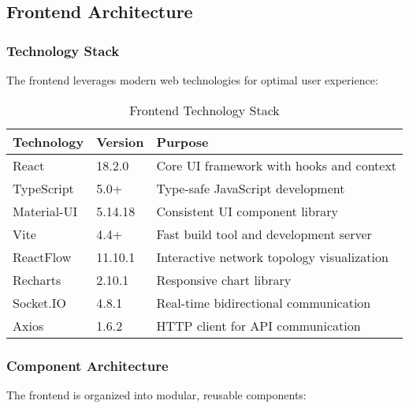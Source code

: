 \subsection{Frontend Architecture}

\subsubsection{Technology Stack}

The frontend leverages modern web technologies for optimal user experience:

\begin{table}[H]
\centering
\caption{Frontend Technology Stack}
\label{tab:frontend-stack}
\begin{tabular}{@{}llp{6cm}@{}}
\toprule
\textbf{Technology} & \textbf{Version} & \textbf{Purpose} \\
\midrule
React & 18.2.0 & Core UI framework with hooks and context \\
TypeScript & 5.0+ & Type-safe JavaScript development \\
Material-UI & 5.14.18 & Consistent UI component library \\
Vite & 4.4+ & Fast build tool and development server \\
ReactFlow & 11.10.1 & Interactive network topology visualization \\
Recharts & 2.10.1 & Responsive chart library \\
Socket.IO & 4.8.1 & Real-time bidirectional communication \\
Axios & 1.6.2 & HTTP client for API communication \\
\bottomrule
\end{tabular}
\end{table}

\subsubsection{Component Architecture}

The frontend is organized into modular, reusable components:


